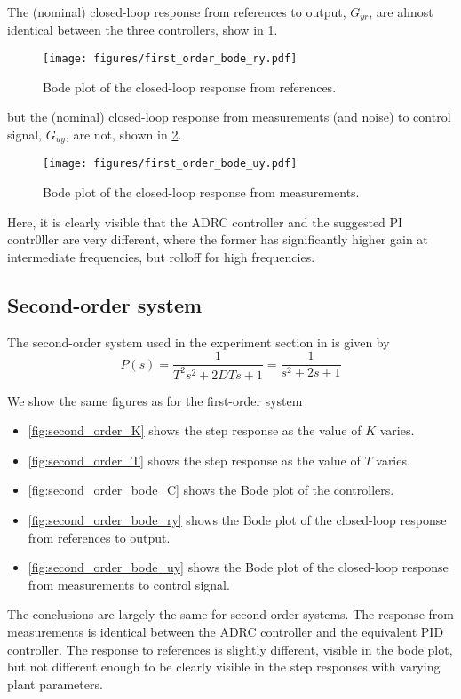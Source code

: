 \documentclass[letterpaper, 10 pt, conference]{ieeeconf}
\begin{document}
The (nominal) closed-loop response from references to output, $G_{yr}$, are almost identical between the three controllers, show in \cref{fig:first_order_bode_ry}.
\begin{figure}[h]
	\centering
	\texttt{[image: figures/first\_order\_bode\_ry.pdf]}
	\caption{Bode plot of the closed-loop response from references.}
	\label{fig:first_order_bode_ry}
\end{figure}

but the (nominal) closed-loop response from measurements (and noise) to control signal, $G_{uy}$, are not, shown in \cref{fig:first_order_bode_uy}.
\begin{figure}[h]
	\centering
	\texttt{[image: figures/first\_order\_bode\_uy.pdf]}
	\caption{Bode plot of the closed-loop response from measurements.}
	\label{fig:first_order_bode_uy}
\end{figure}
Here, it is clearly visible that the ADRC controller and the suggested PI contr0ller are very different, where the former has significantly higher gain at intermediate frequencies, but rolloff for high frequencies.

\subsection{Second-order system}
The second-order system used in the experiment section in \cite{herbst2013simulative} is given by
$$P(s) = \dfrac{1}{T^2s^2 + 2DTs + 1} = \dfrac{1}{s^2 + 2s + 1}$$

We show the same figures as for the first-order system
\begin{itemize}
	\item \cref{fig:second_order_K} shows the step response as the value of $K$ varies.
	\item \cref{fig:second_order_T} shows the step response as the value of $T$ varies.
	\item \cref{fig:second_order_bode_C} shows the Bode plot of the controllers.
	\item \cref{fig:second_order_bode_ry} shows the Bode plot of the closed-loop response from references to output.
	\item \cref{fig:second_order_bode_uy} shows the Bode plot of the closed-loop response from measurements to control signal.
\end{itemize}
The conclusions are largely the same for second-order systems. The response from measurements is identical between the ADRC controller and the equivalent PID controller. The response to references is slightly different, visible in the bode plot, but not different enough to be clearly visible in the step responses with varying plant parameters.
\end{document}
